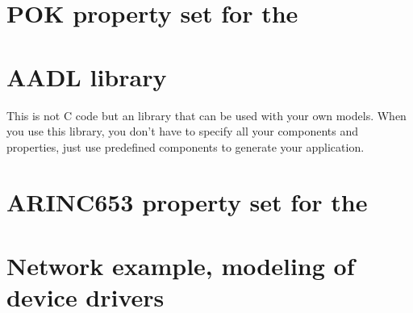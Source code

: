    \section{POK property set for the \aadl}
   

   \section{AADL library}
   This is not C code but an \aadl library that can be used with your own
   models. When you use this library, you don't have to specify all your
   components and properties, just use predefined components to generate your
   application.

   

   \section{ARINC653 property set for the \aadl}
   

   \section{Network example, modeling of device drivers}
   \label{annex-device-driver}
   
   
   

